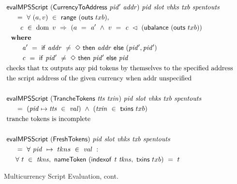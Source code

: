 \begin{figure*}[htb]
  \begin{align*}
    & \mathsf{evalMPSScript}
     ~(\mathsf{CurrencyToAddress}~\mathit{pid'}~\mathit{addr})~\mathit{pid}~ \mathit{slot}~\mathit{vhks} ~\mathit{txb}~\mathit{spentouts} \\
    &~~~~ =~ \forall~(a, v)~\in~\mathsf{range}~(\mathsf{outs}~txb),~\\
    &~~~~~~ \mathit{c}~\in~\operatorname{dom}~v~\Rightarrow~(a~=~ \mathit{a'} ~\wedge~
                       v~=~\mathit{c}~ \lhd~(\mathsf{ubalance}~(\mathsf{outs}~txb)) \\
    & ~ ~ \mathbf{where}~ ~  \\
    & ~~~~~~~ \mathit{a'}~=~\mathsf{if}~ \mathit{addr}~\neq~\Diamond~\mathsf{then}~\mathit{addr}~\mathsf{else}~\mathit{(pid',pid')} \\
    & ~~~~~~~ \mathit{c}~=~\mathsf{if}~ \mathit{pid'}~\neq~\Diamond~\mathsf{then}~\mathit{pid'}~\mathsf{else}~\mathit{pid} \\
    & \text{checks that tx outputs any pid tokens by themselves to the specified address} \\
    & \text {the script address of the given currency when addr unspecified} \\~\\
    & \mathsf{evalMPSScript}
     ~(\mathsf{TrancheTokens}~\mathit{tts}~\mathit{txin})~\mathit{pid}~\mathit{slot}~\mathit{vhks}
     ~\mathit{txb}~\mathit{spentouts}  \\
    &~~~~ =~(\mathit{pid}\mapsto\mathit{tts}~\in~\mathit{val})~ \wedge~(\mathit{txin}~\in~\mathsf{txins}~{txb}) \\
    & \text{tranche tokens is incomplete} \\~\\
    & \mathsf{evalMPSScript}
     ~(\mathsf{FreshTokens})~\mathit{pid}~\mathit{slot}~\mathit{vhks}
     ~\mathit{txb}~\mathit{spentouts}
      \\
    &~~~~ =~\forall~\mathit{pid}~ \mapsto ~tkns ~\in~ \mathit{val}~:~ \\
    &~~~~ \forall~t~\in~\mathit{tkns},~
        \mathsf{nameToken}~(\mathsf{indexof}~\mathit{t}~\mathit{tkns},~\mathsf{txins}~{txb})~=~t
    \end{align*}
    \caption{Multicurrency Script Evaluation, cont.}
    \label{fig:defs:tx-mc-eval-3}
\end{figure*}

